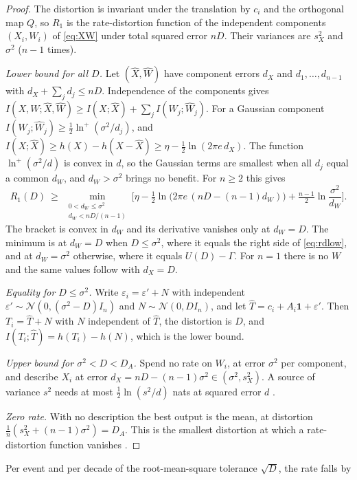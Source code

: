 \documentclass[10pt]{article}
\theoremstyle{remark}
\begin{document}
\begin{proof}
The distortion is invariant under the translation by $c_i$ and the orthogonal map $Q$, so $R_1$ is
the rate-distortion function of the independent components $(X_i,W_i)$ of \eqref{eq:XW} under
total squared error $nD$. Their variances are $s_X^2$ and $\sigma^2$ ($n-1$ times).

\emph{Lower bound for all $D$.} Let $(\hat X,\hat W)$ have component errors $d_X$ and
$d_1,\dots,d_{n-1}$ with $d_X+\sum_jd_j\le nD$. Independence of the components gives
$I(X,W;\hat X,\hat W)\ge I(X;\hat X)+\sum_jI(W_j;\hat W_j)$. For a Gaussian component
$I(W_j;\hat W_j)\ge\tfrac12\ln^+(\sigma^2/d_j)$, and
$I(X;\hat X)\ge h(X)-h(X-\hat X)\ge\eta-\tfrac12\ln(2\pi e\,d_X)$. The function $\ln^+(\sigma^2/d)$
is convex in $d$, so the Gaussian terms are smallest when all $d_j$ equal a common $d_W$, and
$d_W>\sigma^2$ brings no benefit. For $n\ge 2$ this gives
\begin{equation}\label{eq:lb}
  R_1(D)\ \ge\ \min_{\substack{0<d_W\le\sigma^2\\ d_W<nD/(n-1)}}\Big[\eta-\tfrac12\ln\!\big(2\pi e\,(nD-(n-1)d_W)\big)+\tfrac{n-1}{2}\ln\frac{\sigma^2}{d_W}\Big].
\end{equation}
The bracket is convex in $d_W$ and its derivative vanishes only at $d_W=D$. The minimum is at
$d_W=D$ when $D\le\sigma^2$, where it equals the right side of \eqref{eq:rdlow}, and at
$d_W=\sigma^2$ otherwise, where it equals $U(D)-\Gamma$. For $n=1$ there is no $W$ and the same
values follow with $d_X=D$.

\emph{Equality for $D\le\sigma^2$.} Write $\varepsilon_i=\varepsilon'+N$ with independent
$\varepsilon'\sim\mathcal N(0,(\sigma^2-D)I_n)$ and $N\sim\mathcal N(0,DI_n)$, and let
$\hat T=c_i+A_i\mathbf 1+\varepsilon'$. Then $T_i=\hat T+N$ with $N$ independent of $\hat T$, the
distortion is $D$, and $I(T_i;\hat T)=h(T_i)-h(N)$, which is the lower bound.

\emph{Upper bound for $\sigma^2<D<D_A$.} Spend no rate on $W_i$, at error $\sigma^2$ per
component, and describe $X_i$ at error $d_X=nD-(n-1)\sigma^2\in(\sigma^2,s_X^2)$. A source of
variance $s^2$ needs at most $\tfrac12\ln(s^2/d)$ nats at squared error $d$ \cite[Ch.~10]{cover}.

\emph{Zero rate.} With no description the best output is the mean, at distortion
$\tfrac1n(s_X^2+(n-1)\sigma^2)=D_A$. This is the smallest distortion at which a rate-distortion
function vanishes \cite[Ch.~10]{cover}.
\end{proof}
Per event and per decade of the root-mean-square tolerance $\sqrt D$, the rate falls by
\end{document}
